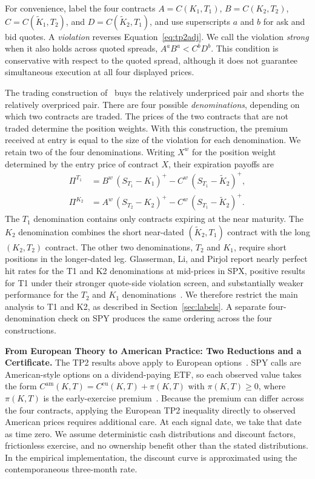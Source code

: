 \documentclass[sigconf,review,anonymous]{acmart}
\begin{document}
For convenience, label the four contracts
$A=C(K_1,T_1)$,
$B=C(K_2,T_2)$,
$C=C(\tilde K_1,T_2)$, and
$D=C(\tilde K_2,T_1)$,
and use superscripts $a$ and $b$ for ask and bid quotes. A \emph{violation} reverses Equation~\eqref{eq:tp2adj}. We call the violation \emph{strong} when it also holds across quoted spreads, $A^aB^a<C^bD^b$. This condition is conservative with respect to the quoted spread, although it does not guarantee simultaneous execution at all four displayed prices.

The trading construction of~\cite{glasserman2025tp2} buys the relatively underpriced pair and shorts the relatively overpriced pair. There are four possible \emph{denominations}, depending on which two contracts are traded. The prices of the two contracts that are not traded determine the position weights. With this construction, the premium received at entry is equal to the size of the violation for each denomination.
We retain two of the four denominations. Writing $X^w$ for the position weight determined by the entry price of contract $X$, their expiration payoffs are
\[
\begin{aligned}
\Pi^{T_1} &= B^{w}\,(S_{T_1}-K_1)^+ - C^{w}\,(S_{T_1}-\tilde K_2)^+,\\
\Pi^{K_2} &= A^{w}\,(S_{T_2}-K_2)^+ - C^{w}\,(S_{T_1}-\tilde K_2)^+ .
\end{aligned}
\]
The $T_1$ denomination contains only contracts expiring at the near maturity. The $K_2$ denomination combines the short near-dated $(\tilde K_2,T_1)$ contract with the long $(K_2,T_2)$ contract. The other two denominations, $T_2$ and $K_1$, require short positions in the longer-dated leg.
Glasserman, Li, and Pirjol report nearly perfect hit rates for the T1 and K2 denominations at mid-prices in SPX, positive results for T1 under their stronger quote-side violation screen, and substantially weaker performance for the $T_2$ and $K_1$ denominations~\cite{glasserman2025tp2}. We therefore restrict the main analysis to T1 and K2, as described in Section~\ref{sec:labels}. A separate four-denomination check on SPY produces the same ordering across the four constructions.

\smallskip\noindent\textbf{From European Theory to American Practice: Two Reductions and a Certificate.}
\label{sec:american}
The TP2 results above apply to European options~\cite{glasserman2026tp2theory}. SPY calls are American-style options on a dividend-paying ETF, so each observed value takes the form $C^{\mathrm{am}}(K,T)=C^{\mathrm{eu}}(K,T)+\pi(K,T)$ with $\pi(K,T)\ge0$, where $\pi(K,T)$ is the early-exercise premium~\cite{cosma2020earlyexercise}. Because the premium can differ across the four contracts, applying the European TP2 inequality directly to observed American prices requires additional care.
At each signal date, we take that date as time zero. We assume deterministic cash distributions and discount factors, frictionless exercise, and no ownership benefit other than the stated distributions. In the empirical implementation, the discount curve is approximated using the contemporaneous three-month rate.
\end{document}
